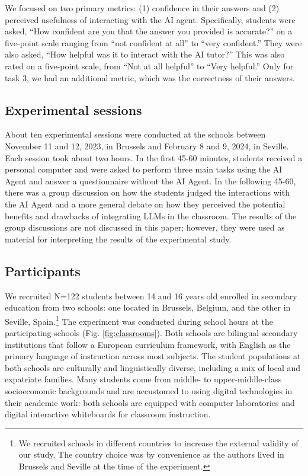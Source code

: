 \documentclass[
  11pt,
]{article}
\begin{document}
We focused on two primary metrics: (1) confidence in their answers and (2) perceived usefulness of interacting with the AI agent. Specifically, students were asked, ``How confident are you that the answer you provided is accurate?'' on a five-point scale ranging from ``not confident at all'' to ``very confident.'' They were also asked, ``How helpful was it to interact with the AI tutor?'' This was also rated on a five-point scale, from ``Not at all helpful'' to ``Very helpful.'' Only for task 3, we had an additional metric, which was the correctness of their answers.

\subsection{Experimental sessions}\label{experimental-sessions}

About ten experimental sessions were conducted at the schools between November 11 and 12, 2023, in Brussels and February 8 and 9, 2024, in Seville. Each session took about two hours. In the first 45-60 minutes, students received a personal computer and were asked to perform three main tasks using the AI Agent and answer a questionnaire without the AI Agent. In the following 45-60, there was a group discussion on how the students judged the interactions with the AI Agent and a more general debate on how they perceived the potential benefits and drawbacks of integrating LLMs in the classroom. The results of the group discussions are not discussed in this paper; however, they were used as material for interpreting the results of the experimental study.

\subsection{Participants}\label{participants}

We recruited N=122 students between 14 and 16 years old enrolled in secondary education from two schools: one located in Brussels, Belgium, and the other in Seville, Spain.\footnote{We recruited schools in different countries to increase the external validity of our study. The country choice was by convenience as the authors lived in Brussels and Seville at the time of the experiment.} The experiment was conducted during school hours at the participating schools (Fig. \ref{fig:classrooms}). Both schools are bilingual secondary institutions that follow a European curriculum framework, with English as the primary language of instruction across most subjects. The student populations at both schools are culturally and linguistically diverse, including a mix of local and expatriate families. Many students come from middle- to upper-middle-class socioeconomic backgrounds and are accustomed to using digital technologies in their academic work: both schools are equipped with computer laboratories and digital interactive whiteboards for classroom instruction.
\end{document}
